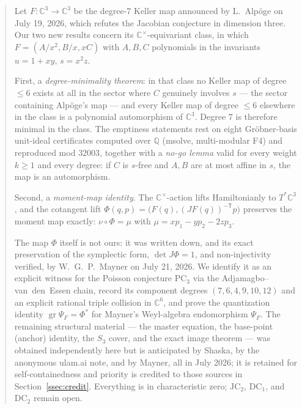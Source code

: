 \documentclass[11pt]{amsart}
\newcommand{\CC}{\mathbb{C}}
\newcommand{\QQ}{\mathbb{Q}}
\newcommand{\Cstar}{\CC^{\times}}
\newcommand{\gr}{\operatorname{gr}}
\newcommand{\JC}{\mathrm{JC}}
\newcommand{\DC}{\mathrm{DC}}
\newcommand{\PC}{\mathrm{PC}}
\theoremstyle{plain}
\theoremstyle{definition}
\theoremstyle{remark}
\begin{document}
\begin{abstract}
Let $F\colon\CC^{3}\to\CC^{3}$ be the degree-$7$ Keller map announced by
L.~Alp\"oge on July 19, 2026, which refutes the Jacobian conjecture in
dimension three. Our two new results concern its $\Cstar$-equivariant
class, in which $F=(A/x^{2},B/x,xC)$ with $A,B,C$ polynomials in the
invariants $u=1+xy$, $s=x^{2}z$.

First, a \emph{degree-minimality theorem}: in that class no Keller map of
degree $\le6$ exists at all in the sector where $C$ genuinely involves $s$
--- the sector containing Alp\"oge's map --- and every Keller map of
degree $\le6$ elsewhere in the class is a polynomial automorphism of
$\CC^{3}$. Degree $7$ is therefore minimal in the class. The emptiness
statements rest on eight Gr\"obner-basis unit-ideal certificates computed
over $\QQ$ (msolve, multi-modular F4) and reproduced mod $32003$, together
with a \emph{no-go lemma} valid for every weight $k\ge1$ and every degree:
if $C$ is $s$-free and $A,B$ are at most affine in $s$, the map is an
automorphism.

Second, a \emph{moment-map identity}. The $\Cstar$-action lifts
Hamiltonianly to $T^{*}\CC^{3}$, and the cotangent lift
$\Phi(q,p)=\bigl(F(q),(JF(q))^{-\mathsf T}p\bigr)$ preserves the moment
map exactly: $\nu\circ\Phi=\mu$ with $\mu=xp_{1}-yp_{2}-2zp_{3}$.

The map $\Phi$ itself is not ours: it was written down, and its exact
preservation of the symplectic form, $\det J\Phi=1$, and non-injectivity
verified, by W.~G.~P.~Mayner on July 21, 2026. We identify it as an
explicit witness for the Poisson conjecture $\PC_{3}$ via the
Adjamagbo--van~den~Essen chain, record its component degrees
$(7,6,4,9,10,12)$ and an explicit rational triple collision in $\CC^{6}$,
and prove the quantization identity $\gr\Psi_{F}=\Phi^{*}$ for Mayner's
Weyl-algebra endomorphism $\Psi_{F}$. The remaining structural material
--- the master equation, the base-point (anchor) identity, the $S_{3}$
cover, and the exact image theorem --- was obtained independently here but
is anticipated by Shaska, by the anonymous ulam.ai note, and by Mayner,
all in July 2026; it is retained for self-containedness and priority is
credited to those sources in Section~\ref{ssec:credit}. Everything is in
characteristic zero; $\JC_{2}$, $\DC_{1}$, and $\DC_{2}$ remain open.
\end{abstract}

\maketitle
\end{document}
